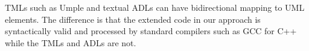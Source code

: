 \noindent
{} TMLs such as Umple \cite{lethbridge2010umplification} and textual ADLs can have bidirectional mapping to UML elements.
The difference is that the extended code in our approach is syntactically valid and processed by standard compilers such as GCC for C++ while the TMLs and ADLs are not.


\begin{comment}
\begin{itemize}[\footnotesize]
	\item RAOES adapts USM features to existing programming languages while Umple or TextUML does inversely, hence RAOES profits all benefices of IDEs such as intelligent completion and easy to implement. Furthermore, RAOES allows to use all specific C++ features such as function pointers for program efficiency, which are not available in the the TMLs.
	
	\item In RAOES, the programmers write and maintain the USM-based behavior part in the same class/file containing the active class.
	
	\item RAOES support full USM features.
	
	\item RAOES automatically synchronizes the code with the system model specified by UML.
	
	\item RAOES defines the state machine topology separately from the transition table and event definition.
\end{itemize}
\end{comment}

